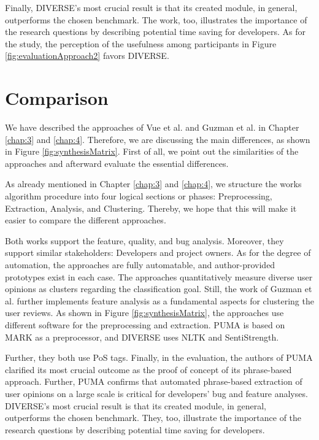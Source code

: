Finally, DIVERSE’s most crucial result is that its created module, in general, outperforms the chosen benchmark. The work, too, illustrates the importance of the research questions by describing potential time saving for developers. As for the study, the perception of the usefulness among participants in Figure \ref{fig:evaluationApproach2} favors DIVERSE.

\chapter{Comparison}
\label{chap:5}

We have described the approaches of Vue et al. \cite{Vu} and Guzman et al. \cite{Guzman} in Chapter \ref{chap:3} and \ref{chap:4}. Therefore, we are discussing the main differences, as shown in Figure \ref{fig:synthesisMatrix}. First of all, we point out the similarities of the approaches and afterward evaluate the essential differences.

As already mentioned in Chapter \ref{chap:3} and \ref{chap:4}, we structure the works algorithm procedure into four logical sections or phases: Preprocessing, Extraction, Analysis, and Clustering. Thereby, we hope that this will make it easier to compare the different approaches.

Both works support the feature, quality, and bug analysis. Moreover, they support similar stakeholders: Developers and project owners. As for the degree of automation, the approaches are fully automatable, and author-provided prototypes exist in each case. The approaches quantitatively measure diverse user opinions as clusters regarding the classification goal. Still, the work of Guzman et al. \cite{Guzman} further implements feature analysis as a fundamental aspects for clustering the user reviews. As shown in Figure \ref{fig:synthesisMatrix}, the approaches use different software for the preprocessing and extraction. PUMA is based on MARK as a preprocessor, and DIVERSE uses NLTK and SentiStrength.

Further, they both use PoS tags. Finally, in the evaluation, the authors of PUMA clarified its most crucial outcome as the proof of concept of its phrase-based approach. Further, PUMA confirms that automated phrase-based extraction of user opinions on a large scale is critical for developers’ bug and feature analyses. DIVERSE’s most crucial result is that its created module, in general, outperforms the chosen benchmark. They, too, illustrate the importance of the research questions by describing potential time saving for developers.

